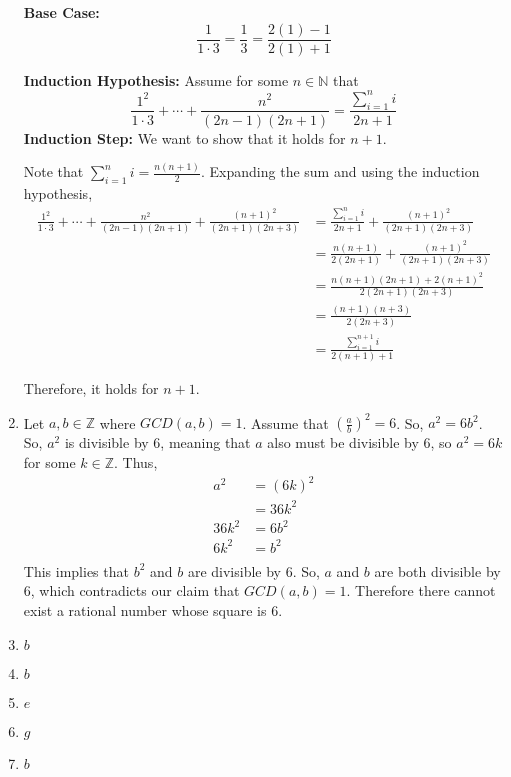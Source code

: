 \documentclass[12pt]{article}
\begin{document}
\begin{enumerate}[start=1,label={\bfseries Exercise \arabic*:},leftmargin=1in]
    \textbf{Base Case:} 
    \[
    \frac{1}{1\cdot3} = \frac{1}{3} = \frac{2(1)-1}{2(1)+1}
    \]

    \textbf{Induction Hypothesis:}  Assume for some $n \in \mathbb{N}$ that 
    \[
        \frac{1^2}{1\cdot 3} + \cdots + \frac{n^2}{(2n-1)(2n+1)} = \frac{\sum^n_{i=1}i}{2n + 1}
    \]
    \textbf{Induction Step:} We want to show that it holds for $n+1$. 

    Note that $\sum_{i=1}^n i = \frac{n(n+1)}{2}$.
    Expanding the sum and using the induction hypothesis,
    \begin{align*}
        \frac{1^2}{1\cdot 3} + \cdots + \frac{n^2}{(2n-1)(2n+1)} + \frac{(n+1)^2}{(2n+1)(2n+3)} &= \frac{\sum^n_{i=1}i}{2n + 1} +  \frac{(n+1)^2}{(2n+1)(2n+3)}\\
        &= \frac{n(n+1)}{2(2n+1)} + \frac{(n+1)^2}{(2n+1)(2n+3)}\\
        &= \frac{n(n+1)(2n+1) + 2(n+1)^2}{2(2n+1)(2n+3)}\\
        &= \frac{(n+1)(n+3)}{2(2n+3)}\\
        &= \frac{\sum^{n+1}_{i=1}i}{2(n+1)+1}
    \end{align*}

    Therefore, it holds for $n+1$. 
    \item Let $a, b \in \mathbb{Z}$ where $GCD(a, b) = 1$. Assume that $(\frac{a}{b})^2 = 6$. 
    So, $a^2 = 6b^2$. So, $a^2$ is divisible by 6, meaning that $a$ also must be divisible by 6, so
    $a^2 = 6k$ for some $k \in \mathbb{Z}$. Thus, 
    \begin{align*}
        a^2 &= (6k)^2 \\
        &= 36k^2\\
        36k^2 &= 6b^2 \\
        6k^2 &= b^2 \\
    \end{align*}
    This implies that $b^2$ and $b$ are divisible by 6. So, $a$ and $b$ are both divisible by 6, 
    which contradicts our claim that $GCD(a, b) = 1$. Therefore there cannot exist a rational number whose square is 6.
    \item $b$
    \item $b$
    \item $e$
    \item $g$
    \item $b$
\end{enumerate}
\end{document}
